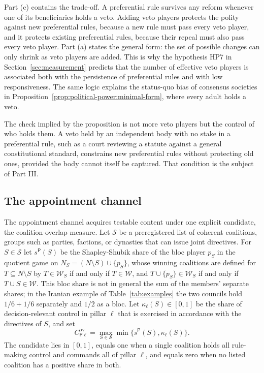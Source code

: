 \documentclass[11pt,letterpaper]{article}
\theoremstyle{definition}
\theoremstyle{remark}
\newcommand{\pP}{\mathsf{P}}
\newcommand{\Win}{\mathcal{W}}
\begin{document}
Part (c) contains the trade-off. A preferential rule survives any reform whenever one of its beneficiaries holds a veto. Adding veto players protects the polity against new preferential rules, because a new rule must pass every veto player, and it protects existing preferential rules, because their repeal must also pass every veto player. Part (a) states the general form: the set of possible changes can only shrink as veto players are added. This is why the hypothesis HP7 in Section~\ref{sec:measurement} predicts that the number of effective veto players is associated both with the persistence of preferential rules and with low responsiveness. The same logic explains the status-quo bias of consensus societies in Proposition~\ref{prop:political-power:minimal-form}, where every adult holds a veto.

The check implied by the proposition is not more veto players but the control of who holds them. A veto held by an independent body with no stake in a preferential rule, such as a court reviewing a statute against a general constitutional standard, constrains new preferential rules without protecting old ones, provided the body cannot itself be captured. That condition is the subject of Part III.

\subsection{The appointment channel}

The appointment channel acquires testable content under one explicit candidate, the coalition-overlap measure. Let $\mathcal{S}$ be a preregistered list of coherent coalitions, groups such as parties, factions, or dynasties that can issue joint directives. For $S\in\mathcal{S}$ let $s^{\pP}(S)$ be the Shapley-Shubik share of the bloc player $p_S$ in the quotient game on $N_S=(N\setminus S)\cup\{p_S\}$, whose winning coalitions are defined for $T\subseteq N\setminus S$ by $T\in\Win_S$ if and only if $T\in\Win$, and $T\cup\{p_S\}\in\Win_S$ if and only if $T\cup S\in\Win$. This bloc share is not in general the sum of the members' separate shares; in the Iranian example of Table~\ref{tab:examples} the two councils hold $1/6+1/6$ separately and $1/2$ as a bloc. Let $\kappa_\ell(S)\in[0,1]$ be the share of decision-relevant control in pillar $\ell$ that is exercised in accordance with the directives of $S$, and set
\begin{equation}
C^{\mathrm{ov}}_{\pP\ell}=\max_{S\in\mathcal{S}}\min\{s^{\pP}(S),\kappa_\ell(S)\}.
\label{eq:overlap}
\end{equation}
The candidate lies in $[0,1]$, equals one when a single coalition holds all rule-making control and commands all of pillar $\ell$, and equals zero when no listed coalition has a positive share in both.
\end{document}
